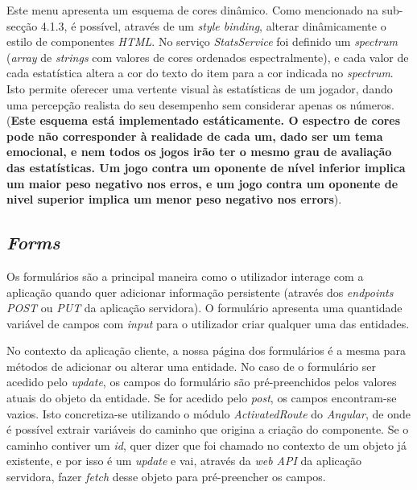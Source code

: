 Este menu apresenta um esquema de cores dinâmico. Como mencionado na sub-secção 4.1.3, é possível, através de um \textit{style binding}, alterar dinâmicamente o estilo de componentes \textit{HTML}. No serviço \textit{StatsService} foi definido um \textit{spectrum} (\textit{array} de \textit{strings} com valores de cores ordenados espectralmente), e cada valor de cada estatística altera a cor do texto do item para a cor indicada no \textit{spectrum}. Isto permite oferecer uma vertente visual às estatísticas de um jogador, dando uma percepção realista do seu desempenho sem considerar apenas os números. (\textbf{Este esquema está implementado estáticamente. O espectro de cores pode não corresponder à realidade de cada um, dado ser um tema emocional, e nem todos os jogos irão ter o mesmo grau de avaliação das estatísticas. Um jogo contra um oponente de nível inferior implica um maior peso negativo nos erros, e um jogo contra um oponente de nivel superior implica um menor peso negativo nos errors}).

\subsection{\textit{Forms}}\label{subsec428}
Os formulários são a principal maneira como o utilizador interage com a aplicação quando quer adicionar informação persistente (através dos \textit{endpoints} \textit{POST} ou \textit{PUT} da aplicação servidora). O formulário apresenta uma quantidade variável de campos com \textit{input} para o utilizador criar qualquer uma das entidades. 

No contexto da aplicação cliente, a nossa página dos formulários é a mesma para métodos de adicionar ou alterar uma entidade. No caso de o formulário ser acedido pelo \textit{update}, os campos do formulário são pré-preenchidos pelos valores atuais do objeto da entidade. Se for acedido pelo \textit{post}, os campos encontram-se vazios.
Isto concretiza-se utilizando o módulo \textit{ActivatedRoute} do \textit{Angular}, de onde é possível extrair variáveis do caminho que origina a criação do componente. Se o caminho contiver um \textit{id}, quer dizer que foi chamado no contexto de um objeto já existente, e por isso é um \textit{update} e vai, através da \textit{web API} da aplicação servidora, fazer \textit{fetch} desse objeto para pré-preencher os campos.

